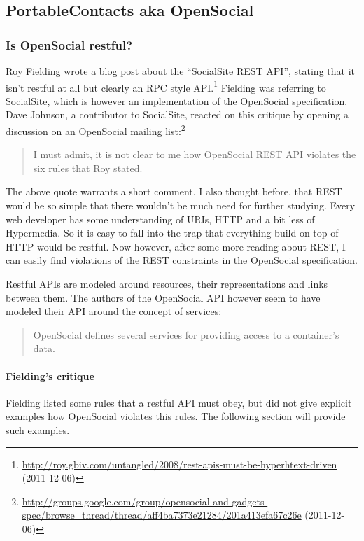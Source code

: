 \documentclass[12pt,a4paper]{scrartcl}		%
\newcommand{\citeurl}[2]{\url{#1} (#2)}
\begin{document}
\subsection{PortableContacts aka OpenSocial}

\subsubsection{Is OpenSocial restful?}

Roy Fielding wrote a blog post about the ``SocialSite REST API'', stating that
it isn't restful at all but clearly an RPC style
API.\footnote{\citeurl{http://roy.gbiv.com/untangled/2008/rest-apis-must-be-hyperhtext-driven}{2011-12-06}}
Fielding was referring to SocialSite, which is however an implementation of the
OpenSocial specification. Dave Johnson, a contributor to SocialSite, reacted on
this critique by opening a discussion on an OpenSocial mailing
list:\footnote{\citeurl{http://groups.google.com/group/opensocial-and-gadgets-spec/browse_thread/thread/aff4ba7373e21284/201a413efa67c26e}{2011-12-06}}
\begin{quote}
  I must admit, it is not clear to me how OpenSocial REST API violates the six
  rules that Roy stated.
\end{quote}
The above quote warrants a short comment. I also thought before, that REST would
be so simple that there wouldn't be much need for further studying. Every web
developer has some understanding of URIs, HTTP and a bit less of Hypermedia. So
it is easy to fall into the trap that everything build on top of HTTP would be
restful. Now however, after some more reading about REST, I can easily find
violations of the REST constraints in the OpenSocial specification.

Restful APIs are modeled around resources, their representations and links
between them. The authors of the OpenSocial API however seem to have modeled
their API around the concept of services:\cite[Social API Server, sec 2, Services]{OSSpec2.0.1}
\begin{quote}
  OpenSocial defines several services for providing access to a container's data.
\end{quote}

\paragraph{Fielding's critique}
Fielding listed some rules that a restful API must obey, but did not give
explicit examples how OpenSocial violates this rules. The following section will
provide such examples.
\end{document}
